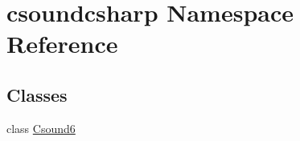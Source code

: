 \hypertarget{namespacecsoundcsharp}{}\section{csoundcsharp Namespace Reference}
\label{namespacecsoundcsharp}
\subsection*{Classes}
\begin{DoxyCompactItemize}
\item 
class \hyperlink{classcsoundcsharp_1_1_csound6}{Csound6}
\end{DoxyCompactItemize}

